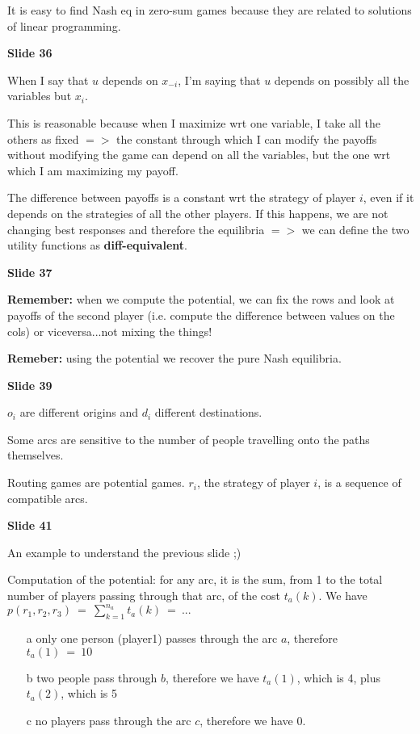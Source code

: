 \documentclass[pt11,a4paper,twoside,reqno,openright]{paper}
\begin{document}
\noindent It is easy to find Nash eq in zero-sum games because they are 
related to solutions of linear programming.

\bigskip
\noindent \textbf{Slide 36}

\noindent When I say that $u$ depends on $x_{-i}$, I'm saying that $u$ 
depends on possibly all the variables but $x_i$.

\noindent This is reasonable because when I maximize wrt one variable, I 
take all the others as fixed $=>$ the constant through which I can modify 
the payoffs without modifying the game can depend on all the variables, but 
the one wrt which I am maximizing my payoff.

\noindent The difference between payoffs is a constant wrt the strategy 
of player $i$, even if it depends on the strategies of all the other 
players. If this happens, we are not changing best responses and therefore 
the equilibria $=>$ we can define the two utility functions as 
\textbf{diff-equivalent}.

\bigskip
\noindent \textbf{Slide 37}

\noindent \textbf{Remember:} when we compute the potential, we can fix 
the rows and look at payoffs of the second player (i.e. compute the 
difference between values on the cols) or viceversa...not mixing the 
things!

\noindent \textbf{Remeber:} using the potential we recover the pure Nash 
equilibria.

\bigskip
\noindent \textbf{Slide 39}

\noindent $o_i$ are different origins and $d_i$ different destinations. 

\noindent Some arcs are sensitive to the number of people travelling onto 
the paths themselves.

\noindent Routing games are potential games. $r_i$, the strategy of player 
$i$, is a sequence of compatible arcs.

\bigskip
\noindent \textbf{Slide 41}

\noindent An example to understand the previous slide ;)

\noindent Computation of the potential: for any arc, it is the sum, 
from 1 to the total number of players passing through that arc, of the 
cost $t_a(k)$. We have $p(r_1,r_2,r_3)~=~\sum_{k=1}^{n_a}{t_a(k)~=~...}$
\begin{enumerate}
	\item[a] only one person (player1) passes through the arc $a$, 
		therefore\\ $t_a(1)~=~10$
	\item[b] two people pass through $b$, therefore we have $t_a(1)$, 
		which is 4, plus $t_a(2)$, which is 5
	\item[c] no players pass through the arc $c$, therefore we have 0.
\end{enumerate}
\end{document}
